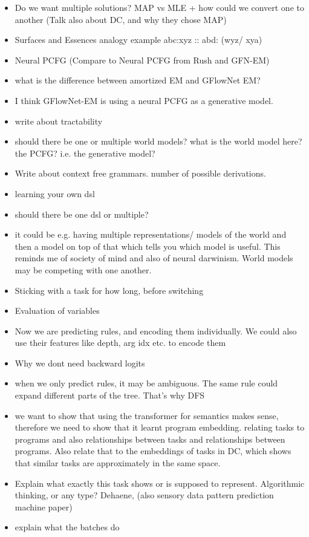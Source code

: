 \begin{itemize}
    \item Do we want multiple solutions? MAP vs MLE + how could we convert one to another (Talk also about DC, and why they chose MAP)
    \item Surfaces and Essences analogy example abc:xyz :: abd: (wyz/ xya) 
    \item Neural PCFG (Compare to Neural PCFG from Rush and GFN-EM)
    \item what is the difference between amortized EM and GFlowNet EM?
    \item I think GFlowNet-EM is using a neural PCFG as a generative model. 
    \item write about tractability 
    \item should there be one or multiple world models?  what is the world model here? the PCFG? i.e. the generative model? 
    \item Write about context free grammars. number of possible derivations.
    \item learning your own dsl
    \item should there be one dsl or multiple?
    \item it could be e.g. having multiple representations/ models of the world and then a model on top of that which tells you which model is useful. This reminds me of society of mind and also of neural darwinism. World models may be competing with one another. 
    \item Sticking with a task for how long, before switching
    \item Evaluation of variables
    \item Now we are predicting rules, and encoding them individually. We could also use their features like depth, arg idx etc. to encode them 
    \item Why we dont need backward logits
    \item when we only predict rules, it may be ambiguous. The same rule could expand different parts of the tree. That's why DFS
    \item we want to show that using the transformer for semantics makes sense, therefore we need to show that it learnt program embedding. relating tasks to programs and also relationships between tasks and relationships between programs. Also relate that to the embeddings of tasks in DC, which shows that similar tasks are approximately in the same space.
    \item Explain what exactly this task shows or is supposed to represent. Algorithmic thinking, or any type? Dehaene, (also sensory data pattern prediction machine paper)
    \item explain what the batches do
    
\end{itemize}


